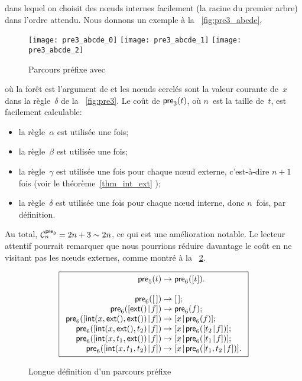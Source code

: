 dans lequel on choisit des nœuds internes facilement (la racine du
premier arbre) dans l'ordre attendu. Nous donnons un exemple à la \fig~\vref{fig:pre3_abcde},
\begin{figure}
\centering
\texttt{[image: pre3\_abcde\_0]}
\texttt{[image: pre3\_abcde\_1]}
\texttt{[image: pre3\_abcde\_2]}
\caption{Parcours préfixe avec }
\label{fig:pre3_abcde}
\end{figure}
où la forêt est l'argument de  et les nœuds
cerclés sont la valeur courante de~\(x\) dans la règle~\(\delta\) de
la \fig~\ref{fig:pre3}. Le coût de
\(\fun{pre}_3(t)\), où \(n\)~est la taille
de~\(t\), est facilement calculable:
\begin{itemize}

  \item la règle~\(\alpha\) est utilisée une fois;

  \item la règle~\(\beta\) est utilisée une fois;

  \item la règle~\(\gamma\) est utilisée une fois pour chaque nœud
    externe, c'est-à-dire \(n+1\) fois (voir le
    théorème~\ref{thm_int_ext} );

  \item la règle~\(\delta\) est utilisée une fois pour chaque nœud
    interne, donc \(n\)~fois, par définition.

\end{itemize}
Au total, \(\C{\fun{pre}_3}{n} = 2n + 3 \sim
2n\), ce qui est une amélioration
notable. Le lecteur attentif pourrait remarquer que nous pourrions
réduire davantage le coût en ne visitant pas les nœuds externes,
comme montré à la \fig~\ref{fig:pre5}.
\begin{figure}[b]
\begin{equation*}
\boxed{
\begin{array}{r@{\;}c@{\;}l}
\fun{pre}_5(t) & \rightarrow & \fun{pre}_6([t]).\\
\\
\fun{pre}_6(\el) & \rightarrow & \el;\\
\fun{pre}_6(\cons{\fun{ext}()}{f})
  & \rightarrow & \fun{pre}_6(f);\\
\fun{pre}_6(\cons{\fun{int}(x,\fun{ext}(),\fun{ext}())}{f})
  & \rightarrow & \cons{x}{\fun{pre}_6(f)};\\
\fun{pre}_6(\cons{\fun{int}(x,\fun{ext}(),t_2)}{f})
  & \rightarrow & \cons{x}{\fun{pre}_6(\cons{t_2}{f})};\\
\fun{pre}_6(\cons{\fun{int}(x, t_1, \fun{ext}())}{f})
  & \rightarrow & \cons{x}{\fun{pre}_6(\cons{t_1}{f})};\\
\fun{pre}_6(\cons{\fun{int}(x,t_1,t_2)}{f})
  & \rightarrow & \cons{x}{\fun{pre}_6(\cons{t_1,t_2}{f})}.
\end{array}}
\end{equation*}
\caption{Longue définition d'un parcours préfixe}
\label{fig:pre5}
\end{figure}
